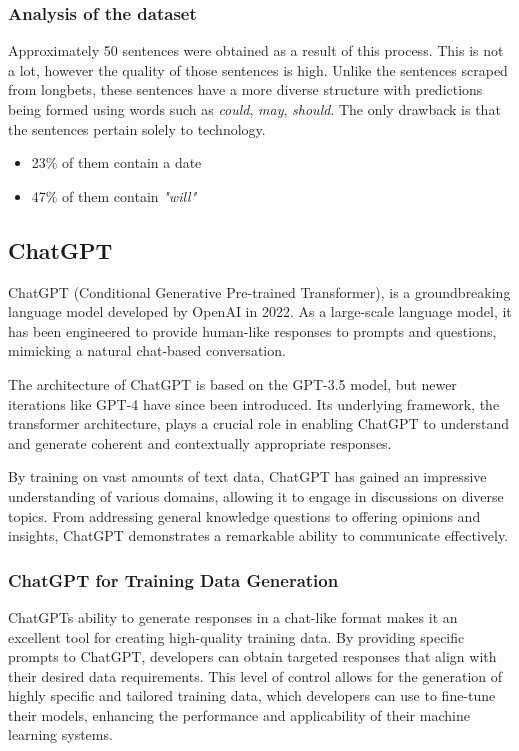\documentclass[a4paper,12pt]{report} %
\begin{document}
\subsubsection{Analysis of the dataset}
Approximately 50 sentences were obtained as a result of this process. This is not a lot, however the quality of those sentences is high. Unlike the sentences scraped from longbets, these sentences have a more diverse structure with predictions being formed using words such as \textit{could}, \textit{may}, \textit{should}. The only drawback is that the sentences pertain solely to technology.

\begin{itemize}
  \item 23\% of them contain a date
  \item 47\% of them contain \textit{"will"}
\end{itemize}


\subsection{ChatGPT} %
ChatGPT (Conditional Generative Pre-trained Transformer), is a groundbreaking language model developed by OpenAI in 2022. As a large-scale language model, it has been engineered to provide human-like responses to prompts and questions, mimicking a natural chat-based conversation. 

The architecture of ChatGPT is based on the GPT-3.5 model, but newer iterations like GPT-4 have since been introduced. Its underlying framework, the transformer architecture, plays a crucial role in enabling ChatGPT to understand and generate coherent and contextually appropriate responses.

By training on vast amounts of text data, ChatGPT has gained an impressive understanding of various domains, allowing it to engage in discussions on diverse topics. From addressing general knowledge questions to offering opinions and insights, ChatGPT demonstrates a remarkable ability to communicate effectively.

\subsubsection{ChatGPT for Training Data Generation}
ChatGPTs ability to generate responses in a chat-like format makes it an excellent tool for creating high-quality training data. By providing specific prompts to ChatGPT, developers can obtain targeted responses that align with their desired data requirements. This level of control allows for the generation of highly specific and tailored training data, which developers can use to fine-tune their models, enhancing the performance and applicability of their machine learning systems.
\end{document}
